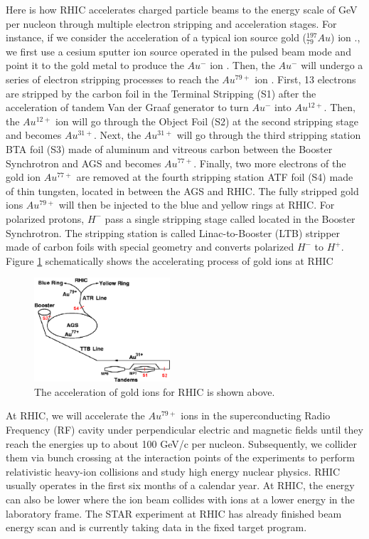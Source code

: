 Here is how RHIC accelerates charged particle beams to the energy scale of GeV per nucleon through multiple electron stripping and acceleration stages. For instance, if we consider the acceleration of a typical ion source gold (${}^{197}_{79}Au$) ion \cite{AuStripping}., we first use a cesium sputter ion source operated in the pulsed beam mode and point it to the gold metal to produce the $Au^-$ ion \cite{FirstAuSource}. Then, the $Au^{-}$ will undergo a series of electron stripping processes to reach the $Au^{79+}$ ion \cite{RHICStrpDetail}. First, 13 electrons are stripped by the carbon foil in the Terminal Stripping (S1) after the acceleration of tandem Van der Graaf generator to turn $Au^{-}$ into $Au^{12+}$. Then, the $Au^{12+}$ ion will go through the Object Foil (S2) at the second stripping stage and becomes $Au^{31+}$. Next, the $Au^{31+}$ will go through the third stripping station BTA foil (S3) made of aluminum and vitreous carbon between the Booster Synchrotron and AGS and becomes $Au^{77+}$. Finally, two more electrons of the gold ion $Au^{77+}$ are removed at the fourth stripping station ATF foil (S4) made of thin tungsten, located in between the AGS and RHIC. The fully stripped gold ions $Au^{79+}$ will then be injected to the blue and yellow rings at RHIC. For polarized protons, $H^-$ pass a single stripping stage called located in the Booster Synchrotron. The stripping station is called Linac-to-Booster (LTB) stripper made of carbon foils with special geometry and converts polarized $H^-$ to $H^+$. Figure \ref{AccAu} schematically shows the accelerating process of gold ions at RHIC \cite{AuStripRef}

\begin{figure}[hbtp]
\begin{center}
\includegraphics[width=0.45\textwidth]{Figures/Chapter1/AccAu.png}
\caption{The acceleration of gold ions for RHIC is shown above.}
\label{AccAu}
\end{center}
\end{figure} 

At RHIC, we will accelerate the $Au^{79+}$ ions in the superconducting Radio Frequency (RF) cavity under perpendicular electric and magnetic fields until they reach the energies up to about 100 GeV/c per nucleon. Subsequently, we collider them via bunch crossing at the interaction points of the experiments to perform relativistic heavy-ion collisions and study high energy nuclear physics. RHIC usually operates in the first six months of a calendar year. At RHIC, the energy can also be lower where the ion beam collides with ions at a lower energy in the laboratory frame. The STAR experiment at RHIC has already finished beam energy scan and is currently taking data in the fixed target program. 

